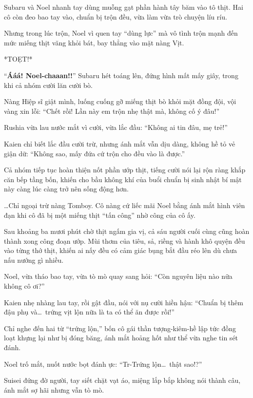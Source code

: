 \documentclass[../main.tex]{subfiles}
\begin{document}
Subaru và Noel nhanh tay dùng muỗng gạt phần hành tây băm vào tô thịt. Hai cô còn đeo bao tay vào, chuẩn bị trộn đều, vừa làm vừa trò chuyện líu ríu.

Nhưng trong lúc trộn, Noel vì quen tay ``dùng lực'' mà vô tình trộn mạnh đến mức miếng thịt văng khỏi bát, bay thẳng vào mặt nàng Vịt.

*TOẸT!*

``\textbf{Ááá! Noel-chaaan!!}'' Subaru hét toáng lên, đứng hình mất mấy giây, trong khi cả nhóm cười lăn cười bò.

Nàng Hiệp sĩ giật mình, luống cuống gỡ miếng thịt bò khỏi mặt đồng đội, vội vàng xin lỗi: ``Chết rồi! Lần này em trộn nhẹ thật mà, không cố ý đâu!''

Rushia vừa lau nước mắt vì cười, vừa lắc đầu: ``Không ai tin đâu, mẹ trẻ!''

Kaien chỉ biết lắc đầu cười trừ, nhưng ánh mắt vẫn dịu dàng, không hề tỏ vẻ giận dữ: ``Không sao, mấy đứa cứ trộn cho đều vào là được.''

Cả nhóm tiếp tục hoàn thiện nốt phần ướp thịt, tiếng cười nói lại rộn ràng khắp căn bếp tầng bốn, khiến cho bầu không khí của buổi chuẩn bị sinh nhật bí mật này càng lúc càng trở nên sống động hơn.

\dots Chỉ ngoại trừ nàng Tomboy. Cô nàng cứ liếc mãi Noel bằng ánh mắt hình viên đạn khi cô đã bị một miếng thịt ``tấn công'' nhờ công của cô ấy.

\ct

Sau khoảng ba mươi phút chờ thịt ngấm gia vị, cả sáu người cuối cùng cũng hoàn thành xong công đoạn ướp. Mùi thơm của tiêu, sả, riềng và hành khô quyện đều vào từng thớ thịt, khiến ai nấy đều có cảm giác bụng bắt đầu réo lên dù chưa nấu nướng gì nhiều.

Noel, vừa tháo bao tay, vừa tò mò quay sang hỏi: ``Còn nguyên liệu nào nữa không cô ơi?''

Kaien nhẹ nhàng lau tay, rồi gật đầu, nói với nụ cười hiền hậu: ``Chuẩn bị thêm đậu phụ và\dots\ trứng vịt lộn nữa là ta có thể ăn được rồi!''

Chỉ nghe đến hai từ ``trứng lộn,'' bốn cô gái thần tượng-kiêm-hề lập tức đồng loạt khựng lại như bị đóng băng, ánh mắt hoảng hốt như thể vừa nghe tin sét đánh.

Noel trố mắt, nuốt nước bọt đánh ực: ``Tr-Trứng lộn\dots\ thật sao!?''

Suisei đứng đờ người, tay siết chặt vạt áo, miệng lắp bắp không nói thành câu, ánh mắt sợ hãi nhưng vẫn tò mò.
\end{document}
